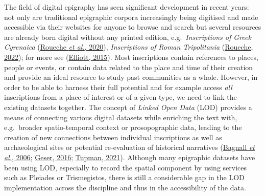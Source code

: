 \documentclass[
  12pt,
]{scrreprt}
\begin{document}
The field of digital epigraphy has seen significant development in
recent years: not only are traditional epigraphic corpora increasingly
being digitised and made accessible via their websites for anyone to
browse and search but several resources are already born digital without
any printed edition, e.g.~\emph{Inscriptions of Greek Cyrenaica}
(\protect\hyperlink{ref-roueche_inscriptions_2020}{Roueche \emph{et
al.}, 2020}), \emph{Inscriptions of Roman Tripolitania}
(\protect\hyperlink{ref-roueche_inscriptions_2022}{Roueche, 2022}); for
more see (\protect\hyperlink{ref-bruun_epigraphy_2015}{Elliott, 2015}).
Most inscriptions contain references to places, people or events, or
contain data related to the place and time of their creation and provide
an ideal resource to study past communities as a whole. However, in
order to be able to harness their full potential and for example access
\emph{all} inscriptions from a place of interest or of a given type, we
need to link the existing datasets together. The concept of \emph{Linked
Open Data} (LOD) provides a means of connecting various digital datasets
while enriching the text with, e.g.~broader spatio-temporal context or
prosopographic data, leading to the creation of new connections between
individual inscriptions as well as archaeological sites or potential
re-evaluation of historical narratives
(\protect\hyperlink{ref-bagnall_pleiades_2006}{Bagnall \emph{et al.},
2006}; \protect\hyperlink{ref-geser_wp15_2016}{Geser, 2016};
\protect\hyperlink{ref-tupman_where_2021}{Tupman, 2021}). Although many
epigraphic datasets have been using LOD, especially to record the
spatial component by using services such as Pleiades or Trismegistos,
there is still a considerable gap in the LOD implementation across the
discipline and thus in the accessibility of the data.
\end{document}
